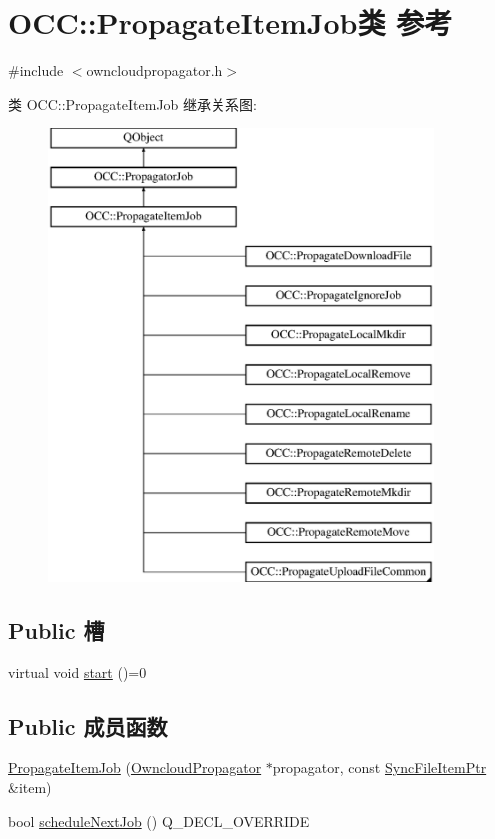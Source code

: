 \hypertarget{class_o_c_c_1_1_propagate_item_job}{}\section{O\+CC\+:\+:Propagate\+Item\+Job类 参考}
\label{class_o_c_c_1_1_propagate_item_job}


{\ttfamily \#include $<$owncloudpropagator.\+h$>$}

类 O\+CC\+:\+:Propagate\+Item\+Job 继承关系图\+:\begin{figure}[H]
\begin{center}
\leavevmode
\includegraphics[height=12.000000cm]{class_o_c_c_1_1_propagate_item_job}
\end{center}
\end{figure}
\subsection*{Public 槽}
\begin{DoxyCompactItemize}
\item 
virtual void \hyperlink{class_o_c_c_1_1_propagate_item_job_a97e7a37e51ad1696f6590dd52080f10a}{start} ()=0
\end{DoxyCompactItemize}
\subsection*{Public 成员函数}
\begin{DoxyCompactItemize}
\item 
\hyperlink{class_o_c_c_1_1_propagate_item_job_a256ca79c551c1a3cb2a2d3a5308d6a88}{Propagate\+Item\+Job} (\hyperlink{class_o_c_c_1_1_owncloud_propagator}{Owncloud\+Propagator} $\ast$propagator, const \hyperlink{namespace_o_c_c_acb6b0db82893659fbd0c98d3c5b8e2b8}{Sync\+File\+Item\+Ptr} \&item)
\item 
bool \hyperlink{class_o_c_c_1_1_propagate_item_job_adbc930944b34bb37f2a11d7b2bf3ab94}{schedule\+Next\+Job} () Q\+\_\+\+D\+E\+C\+L\+\_\+\+O\+V\+E\+R\+R\+I\+DE
\end{DoxyCompactItemize}

